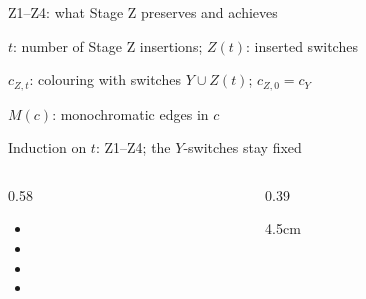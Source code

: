 \begin{frame}[t]{Z1--Z4: what Stage Z preserves and achieves}
  {\normalfont\small\color{black}
    $t$: number of Stage Z insertions; $Z(t)$: inserted switches\par
    $c_{Z,t}$: colouring with switches $Y\cup Z(t)$; $c_{Z,0}=c_Y$\par
    $M(c)$: monochromatic edges in $c$\par
    Induction on $t$: Z1--Z4; the $Y$-switches stay fixed\par
  }
  \smallskip
  \begin{columns}[T,onlytextwidth]
    \begin{column}{0.58\textwidth}
      \footnotesize{}
      \begin{itemize}[itemsep=7pt]
        \item<1-> \Zone
        \item<2-> \Ztwo
        \item<3-> \Zthree
        \item<4-> \Zfour
      \end{itemize}
    \end{column}
    \begin{column}{0.39\textwidth}
      \centering\small{}
      \begin{overlayarea}{\linewidth}{4.5cm}
        \raggedright
      \end{overlayarea}
    \end{column}
  \end{columns}
\end{frame}

